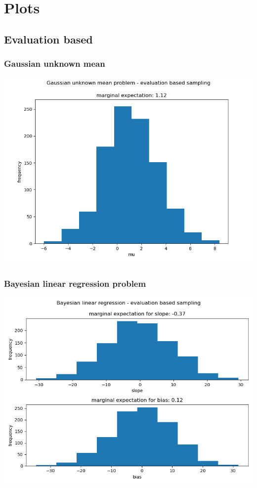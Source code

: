 \documentclass[10pt]{homeworg}
\begin{document}
\section{Plots}

\subsection{Evaluation based}
\subsubsection{Gaussian unknown mean}
\begin{center}
\includegraphics[scale=0.5]{figures/evaluation_1.png}
\end{center}

\subsubsection{Bayesian linear regression problem}
\begin{center}
\includegraphics[scale=0.5]{figures/evaluation_2}
\end{center}
\end{document}
